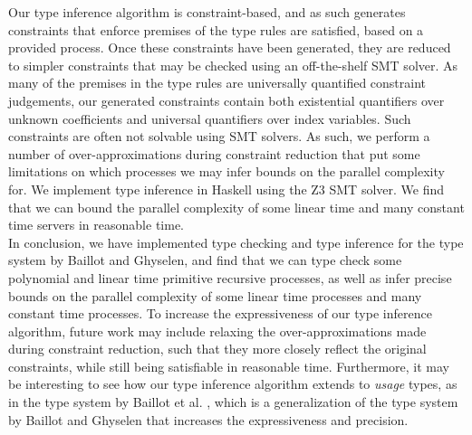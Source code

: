 Our type inference algorithm is constraint-based, and as such generates constraints that enforce premises of the type rules are satisfied, based on a provided process. Once these constraints have been generated, they are reduced to simpler constraints that may be checked using an off-the-shelf SMT solver. As many of the premises in the type rules are universally quantified constraint judgements, our generated constraints contain both existential quantifiers over unknown coefficients and universal quantifiers over index variables. Such constraints are often not solvable using SMT solvers. As such, we perform a number of over-approximations during constraint reduction that put some limitations on which processes we may infer bounds on the parallel complexity for. We implement type inference in Haskell using the Z3 SMT solver. We find that we can bound the parallel complexity of some linear time and many constant time servers in reasonable time.\\

In conclusion, we have implemented type checking and type inference for the type system by Baillot and Ghyselen, and find that we can type check some polynomial and linear time primitive recursive processes, as well as infer precise bounds on the parallel complexity of some linear time processes and many constant time processes. To increase the expressiveness of our type inference algorithm, future work may include relaxing the over-approximations made during constraint reduction, such that they more closely reflect the original constraints, while still being satisfiable in reasonable time. Furthermore, it may be interesting to see how our type inference algorithm extends to \textit{usage} types, as in the type system by Baillot et al. \cite{BaillotEtAl2021}, which is a generalization of the type system by Baillot and Ghyselen that increases the expressiveness and precision.